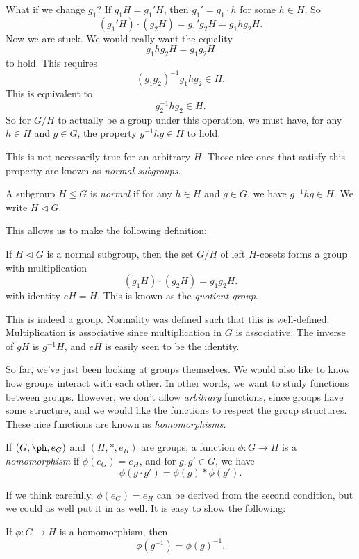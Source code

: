 \documentclass[a4paper]{article}
\begin{document}
What if we change $g_1$? If $g_1H = g_1' H$, then $g_1' = g_1 \cdot h$ for some $h \in H$. So
\[
  (g_1' H) \cdot (g_2 H) = g_1' g_2 H = g_1 h g_2 H.
\]
Now we are stuck. We would really want the equality
\[
  g_1 h g_2 H = g_1 g_2 H
\]
to hold. This requires
\[
  (g_1g_2)^{-1} g_1 h g_2 \in H.
\]
This is equivalent to
\[
  g_2^{-1} h g_2 \in H.
\]
So for $G/H$ to actually be a group under this operation, we must have, for any $h \in H$ and $g \in G$, the property $g^{-1} h g \in H$ to hold.

This is not necessarily true for an arbitrary $H$. Those nice ones that satisfy this property are known as \emph{normal subgroups}.
\begin{defi}
  A subgroup $H \leq G$ is \emph{normal} if for any $h \in H$ and $g \in G$, we have $g^{-1}h g \in H$. We write $H \lhd G$.
\end{defi}

This allows us to make the following definition:
\begin{defi}
  If $H \lhd G$ is a normal subgroup, then the set $G/H$ of left $H$-cosets forms a group with multiplication
  \[
    (g_1 H) \cdot (g_2 H) = g_1 g_2 H.
  \]
  with identity $eH = H$. This is known as the \emph{quotient group}.
\end{defi}
This is indeed a group. Normality was defined such that this is well-defined. Multiplication is associative since multiplication in $G$ is associative. The inverse of $gH$ is $g^{-1}H$, and $eH$ is easily seen to be the identity.

So far, we've just been looking at groups themselves. We would also like to know how groups interact with each other. In other words, we want to study functions between groups. However, we don't allow \emph{arbitrary} functions, since groups have some structure, and we would like the functions to respect the group structures. These nice functions are known as \emph{homomorphisms}.

\begin{defi}[Homomorphism]
  If $(G, \ph, e_G)$ and $(H, *, e_H)$ are groups, a function $\phi: G\to H$ is a \emph{homomorphism} if $\phi(e_G) = e_H$, and for $g, g' \in G$, we have
  \[
    \phi(g \cdot g') = \phi(g) * \phi(g').
  \]
\end{defi}
If we think carefully, $\phi(e_G) = e_H$ can be derived from the second condition, but we could as well put it in as well. It is easy to show the following:
\begin{lemma}
  If $\phi: G \to H$ is a homomorphism, then
  \[
    \phi(g^{-1}) = \phi(g)^{-1}.
  \]
\end{lemma}
\end{document}
